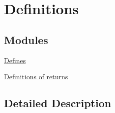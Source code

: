 \hypertarget{group___u_c_l___d_e_f_i_n_i_t_i_o_n_s}{}\section{Definitions}
\label{group___u_c_l___d_e_f_i_n_i_t_i_o_n_s}
\subsection*{Modules}
\begin{DoxyCompactItemize}
\item
\hyperlink{group___u_c_l___d_e_f_i_n_e_s}{Defines}
\item
\hyperlink{group___u_c_l___r_e_t_u_r_n}{Definitions of returns}
\end{DoxyCompactItemize}


\subsection{Detailed Description}
